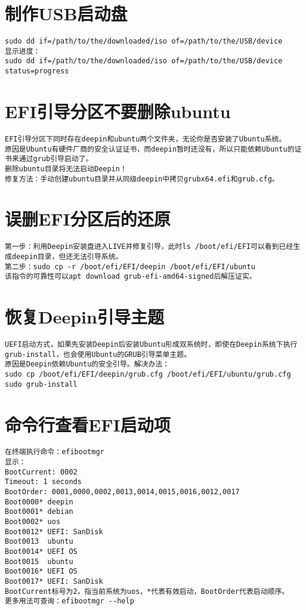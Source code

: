 \documentclass[a4paper,fontset=fandol,zihao=-4,linespread=1.2]{ctexbook}
\begin{document}
\section{制作USB启动盘}
\begin{lstlisting}
sudo dd if=/path/to/the/downloaded/iso of=/path/to/the/USB/device
显示进度：
sudo dd if=/path/to/the/downloaded/iso of=/path/to/the/USB/device status=progress
\end{lstlisting}

\section{EFI引导分区不要删除ubuntu}
\begin{lstlisting}
EFI引导分区下同时存在deepin和ubuntu两个文件夹，无论你是否安装了Ubuntu系统。
原因是Ubuntu有硬件厂商的安全认证证书，而deepin暂时还没有，所以只能依赖Ubuntu的证书来通过grub引导启动了。
删除ubuntu目录将无法启动Deepin！
修复方法：手动创建ubuntu目录并从同级deepin中拷贝grubx64.efi和grub.cfg。
\end{lstlisting}

\section{误删EFI分区后的还原}
\begin{lstlisting}
第一步：利用Deepin安装盘进入LIVE并修复引导，此时ls /boot/efi/EFI可以看到已经生成deepin目录，但还无法引导系统。
第二步：sudo cp -r /boot/efi/EFI/deepin /boot/efi/EFI/ubuntu
该指令的可靠性可以apt download grub-efi-amd64-signed后解压证实。
\end{lstlisting}

\section{恢复Deepin引导主题}
\begin{lstlisting}
UEFI启动方式，如果先安装Deepin后安装Ubuntu形成双系统时，即使在Deepin系统下执行grub-install，也会使用Ubuntu的GRUB引导菜单主题。
原因是Deepin依赖Ubuntu的安全引导。解决办法：
sudo cp /boot/efi/EFI/deepin/grub.cfg /boot/efi/EFI/ubuntu/grub.cfg
sudo grub-install
\end{lstlisting}

\section{命令行查看EFI启动项}
\begin{lstlisting}
在终端执行命令：efibootmgr
显示：
BootCurrent: 0002
Timeout: 1 seconds
BootOrder: 0001,0000,0002,0013,0014,0015,0016,0012,0017
Boot0000* deepin
Boot0001* debian
Boot0002* uos
Boot0012* UEFI: SanDisk
Boot0013  ubuntu
Boot0014* UEFI OS
Boot0015  ubuntu
Boot0016* UEFI OS
Boot0017* UEFI: SanDisk
BootCurrent标号为2，指当前系统为uos，*代表有效启动，BootOrder代表启动顺序。
更多用法可查询：efibootmgr --help
\end{lstlisting}
\end{document}
